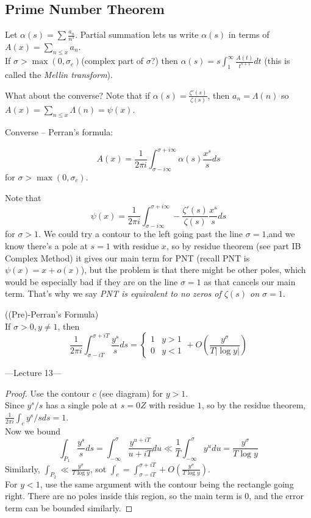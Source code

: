 \documentclass[a4paper]{article}
\begin{document}
\subsection{Prime Number Theorem}

Let $\alpha(s) = \sum \frac{a_n}{n^s}$. Partial summation lets us write $\alpha(s)$ in terms of $A(x) = \sum_{n \leq x} a_n$.\\
If $\sigma > \max(0,\sigma_c)$(complex part of $\sigma$?) then $\alpha(s) = s \int_1^\infty \frac{A(t)}{t^{s+1}} dt$ (this is called the \emph{Mellin transform}).

What about the converse? Note that if $\alpha(s) = \frac{\zeta'(s)}{\zeta(s)}$, then $a_n = \Lambda(n)$ so $A(x) = \sum_{n \leq x} \Lambda(n) = \psi(x)$.

Converse -- Perran's formula:

\[
A(x) = \frac{1}{2\pi i} \int_{\sigma-i\infty}^{\sigma+i\infty} \alpha(s) \frac{x^s}{s} ds
\]
for $\sigma > \max(0,\sigma_c)$.

Note that 
\[
\psi(x) = \frac{1}{2\pi i} \int_{\sigma-i\infty}^{\sigma+i\infty} -\frac{\zeta'(s)}{\zeta(s)} \frac{x^s}{s} ds
\]
for $\sigma > 1$. We could try a contour to the left going past the line $\sigma=1$,and we know there's a pole at $s=1$ with residue $x$, so by residue theorem (see part IB Complex Method) it gives our main term for PNT (recall PNT is $\psi(x) = x+o(x)$), but the problem is that there might be other poles, which would be especially bad if they are on the line $\sigma=1$ as that cancels our main term. That's why we say \emph{PNT is equivalent to no zeros of $\zeta(s)$ on $\sigma=1$}.

\begin{lemma} ((Pre)-Perran's Formula)\\
If $\sigma > 0, y\neq 1$, then 
\[
\frac{1}{2\pi i} \int_{\sigma-iT}^{\sigma+iT} \frac{y^s}{s} ds = 
\left\{
\begin{array}{ll}
1 & y>1\\
0 & y<1
\end{array}
\right.
+ O\left(\frac{y^{\sigma}}{T|\log y|}\right)
\]

---Lecture 13---

\begin{proof}
Use the contour $c$ (see diagram) for $y>1$.\\
Since $y^s/s$ has a single pole at $s=0Z$ with residue $1$, so by the residue theorem, $\frac{1}{2\pi i} \int_c y^s/s ds = 1$.\\
Now we bound
\[
\int_{P_1} \frac{y^s}{s} ds = \int_{-\infty}^\sigma \frac{y^{u+iT}}{u+iT} du \ll \frac{1}{T} \int_{-\infty}^\sigma y^u du = \frac{y^\sigma}{T\log y}
\]
Similarly, $\int_{P_2} \ll \frac{y^\sigma}{T\log y}$, sot $\int_c = \int_{\sigma-iT}^{\sigma+iT} + O(\frac{y^\sigma}{T\log y})$.\\
For $y<1$, use the same argument with the contour being the rectangle going right. There are no poles inside this region, so the main term is 0, and the error term can be bounded similarly.
\end{proof}
\end{lemma}
\end{document}
